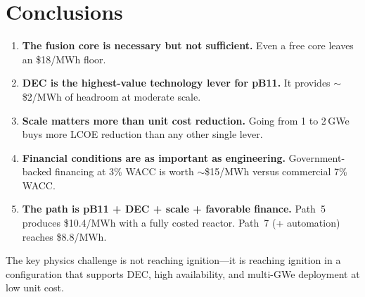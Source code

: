 \documentclass[11pt,a4paper]{article}
\begin{document}
\section{Conclusions}

\begin{enumerate}
\item \textbf{The fusion core is necessary but not sufficient.}  Even
  a free core leaves an \$18/MWh floor.

\item \textbf{DEC is the highest-value technology lever for pB11.}
  It provides $\sim$\$2/MWh of headroom at moderate scale.

\item \textbf{Scale matters more than unit cost reduction.}  Going
  from 1 to 2\,GWe buys more LCOE reduction than any other single
  lever.

\item \textbf{Financial conditions are as important as engineering.}
  Government-backed financing at 3\% WACC is worth $\sim$\$15/MWh
  versus commercial 7\% WACC.

\item \textbf{The path is pB11 + DEC + scale + favorable finance.}
  Path~5 produces \$10.4/MWh with a fully costed reactor.  Path~7
  (+ automation) reaches \$8.8/MWh.
\end{enumerate}

The key physics challenge is not reaching ignition---it is reaching
ignition in a configuration that supports DEC, high availability,
and multi-GWe deployment at low unit cost.
\end{document}
